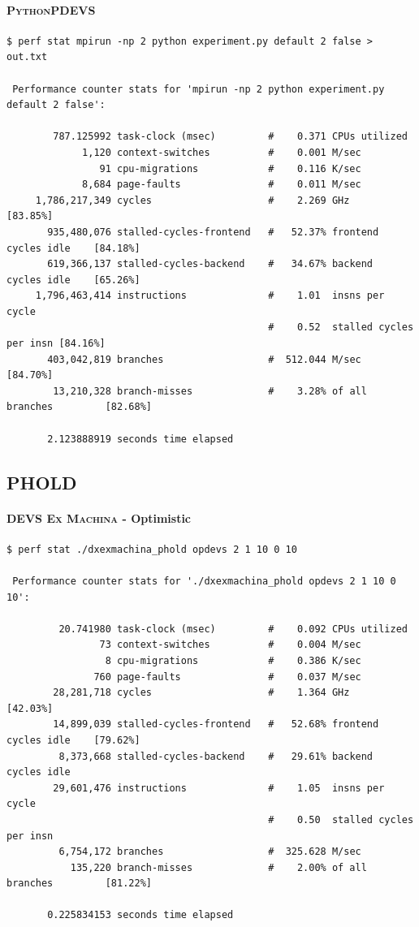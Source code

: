 \documentclass[8pt,a4paper]{report}
\begin{document}
\paragraph{\textsc{PythonPDEVS}}
\begin{Verbatim}[fontsize=\small]
$ perf stat mpirun -np 2 python experiment.py default 2 false > out.txt

 Performance counter stats for 'mpirun -np 2 python experiment.py default 2 false':

        787.125992 task-clock (msec)         #    0.371 CPUs utilized          
             1,120 context-switches          #    0.001 M/sec                  
                91 cpu-migrations            #    0.116 K/sec                  
             8,684 page-faults               #    0.011 M/sec                  
     1,786,217,349 cycles                    #    2.269 GHz                     [83.85%]
       935,480,076 stalled-cycles-frontend   #   52.37% frontend cycles idle    [84.18%]
       619,366,137 stalled-cycles-backend    #   34.67% backend  cycles idle    [65.26%]
     1,796,463,414 instructions              #    1.01  insns per cycle        
                                             #    0.52  stalled cycles per insn [84.16%]
       403,042,819 branches                  #  512.044 M/sec                   [84.70%]
        13,210,328 branch-misses             #    3.28% of all branches         [82.68%]

       2.123888919 seconds time elapsed
\end{Verbatim}

\subsection{PHOLD}
\paragraph{\textsc{DEVS Ex Machina} - Optimistic}
\begin{Verbatim}[fontsize=\small]
$ perf stat ./dxexmachina_phold opdevs 2 1 10 0 10

 Performance counter stats for './dxexmachina_phold opdevs 2 1 10 0 10':

         20.741980 task-clock (msec)         #    0.092 CPUs utilized          
                73 context-switches          #    0.004 M/sec                  
                 8 cpu-migrations            #    0.386 K/sec                  
               760 page-faults               #    0.037 M/sec                  
        28,281,718 cycles                    #    1.364 GHz                     [42.03%]
        14,899,039 stalled-cycles-frontend   #   52.68% frontend cycles idle    [79.62%]
         8,373,668 stalled-cycles-backend    #   29.61% backend  cycles idle   
        29,601,476 instructions              #    1.05  insns per cycle        
                                             #    0.50  stalled cycles per insn
         6,754,172 branches                  #  325.628 M/sec                  
           135,220 branch-misses             #    2.00% of all branches         [81.22%]

       0.225834153 seconds time elapsed
\end{Verbatim}
\end{document}
